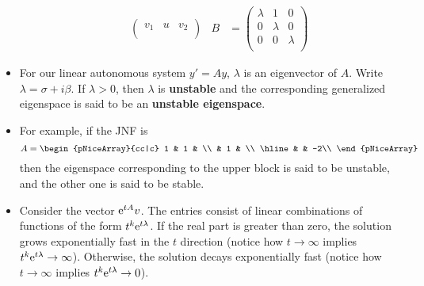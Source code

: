 \documentclass[../notes.tex]{subfiles}
\begin{document}
\begin{itemize}
\begin{itemize}
\begin{align*}
\begin{pmatrix}
                v_1 & u & v_2\\
            \end{pmatrix}&
            B &=
            \begin{pmatrix}
                \lambda & 1 & 0\\
                0 & \lambda & 0\\
                0 & 0 & \lambda\\
            \end{pmatrix}
        \end{align*}
    \end{itemize}
    \item For our linear autonomous system $y'=Ay$, $\lambda$ is an eigenvector of $A$. Write $\lambda=\sigma+i\beta$. If $\lambda>0$, then $\lambda$ is \textbf{unstable} and the corresponding generalized eigenspace is said to be an \textbf{unstable eigenspace}.
    \item For example, if the JNF is
    \begin{equation*}
        A =
        \begin{pNiceArray}{cc|c}
            1 & 1 & \\
             & 1 & \\
            \hline
             &  & -2\\
        \end{pNiceArray}
    \end{equation*}
    then the eigenspace corresponding to the upper block is said to be unstable, and the other one is said to be stable.
    \item Consider the vector $\e[tA]v$. The entries consist of linear combinations of functions of the form $t^k\e[t\lambda]$. If the real part is greater than zero, the solution grows exponentially fast in the $t$ direction (notice how $t\to\infty$ implies $t^k\e[t\lambda]\to\infty$). Otherwise, the solution decays exponentially fast (notice how $t\to\infty$ implies $t^k\e[t\lambda]\to 0$).
\end{itemize}
\end{document}
